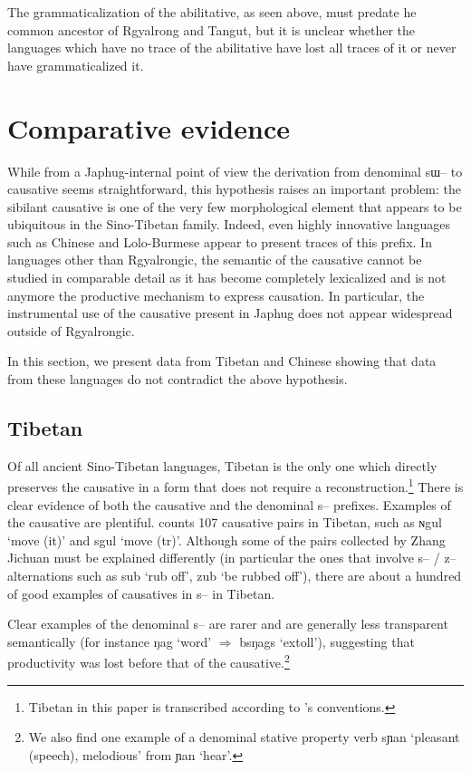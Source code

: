 \documentclass[oldfontcommands,oneside,a4paper,11pt]{article}
\newcommand{\ipa}[1]{{\phon \mbox{#1}}} %
\begin{document}
The grammaticalization of the abilitative, as seen above, must predate he common ancestor of Rgyalrong and Tangut, but it is unclear whether the languages which have no trace of the abilitative have lost all traces of it or never have grammaticalized it.

\section{Comparative evidence}

 While from a Japhug-internal point of view the derivation from denominal \ipa{sɯ--} to causative seems straightforward, this hypothesis raises an important problem:  the sibilant causative is one of the very few morphological element that appears to be ubiquitous in the Sino-Tibetan family. Indeed, even highly innovative languages such as Chinese and Lolo-Burmese appear to present  traces of this prefix. In languages other than Rgyalrongic, the semantic of the causative cannot be studied in comparable detail as it has become completely lexicalized and is not anymore the productive mechanism to express causation. In particular, the instrumental use of the causative present in Japhug does not appear widespread outside of Rgyalrongic.
 
 In this section, we present data from Tibetan and Chinese showing that data from these languages do not contradict the above hypothesis.

 
\subsection{Tibetan}

Of all ancient Sino-Tibetan languages, Tibetan is the only one which directly preserves the causative in a form that does not require a reconstruction.\footnote{Tibetan in this paper is transcribed according to \citet{jacques12transcription}'s conventions.} There is clear evidence of both the causative and the denominal \ipa{s--} prefixes.  Examples of the causative are plentiful. \citet[210-8]{zhang09cizu} counts 107 causative pairs in Tibetan, such as \ipa{ɴgul} `move (it)' and \ipa{sgul} `move (tr)'. Although some of the pairs collected by Zhang Jichuan must be explained differently (in particular the ones that involve \ipa{s--} / \ipa{z--} alternations such as \ipa{sub} `rub off', \ipa{zub} `be rubbed off'), there are about a hundred of good examples of causatives in \ipa{s--} in Tibetan.

Clear examples of the denominal \ipa{s--} are rarer and are generally less transparent semantically (for instance \ipa{ŋag} `word' $\Rightarrow$ \ipa{bsŋags} `extoll'), suggesting that productivity was lost before that of the causative.\footnote{We also find one example of a denominal stative property verb \ipa{sɲan} `pleasant (speech), melodious' from \ipa{ɲan} `hear'. }
\end{document}
